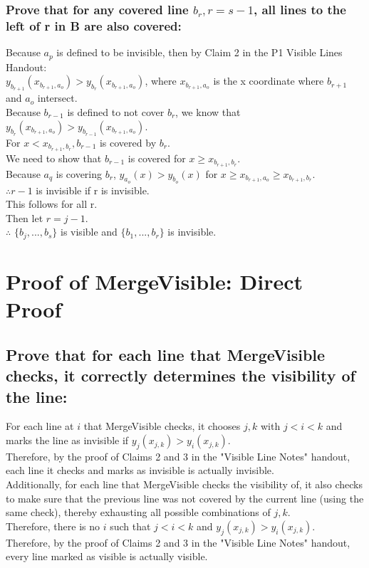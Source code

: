 \documentclass{article}
\begin{document}
    \subsubsection*{Prove that for any covered line  $b_{r}, r = s - 1$, all lines to the left of r in B are also covered:}
        Because $a_p$ is defined to be invisible, then by Claim 2 in the P1 Visible Lines Handout:\\
        $y_{b_{r+1}}(x_{b_{r+1}, a_{o}}) > y_{b_{r}}(x_{b_{r+1},a_{o}})$, where $x_{b_{r+1}, a_{o}}$ is the x coordinate where $b_{r+1}$ and $a_o$ intersect.\\
        Because $b_{r-1}$ is defined to not cover $b_r$, we know that $y_{b_{r}}(x_{b_{r+1}, a_{o}}) > y_{b_{r-1}}(x_{b_{r+1},a_{o}})$.\\
        For $x < x_{b_{r+1},b_{r}}, b_{r-1}$ is covered by $b_r$.\\
        We need to show that $b_{r-1}$ is covered for $x \geq x_{b_{r+1},b_{r}}$.\\
        Because $a_q$ is covering $b_r$, $y_{a_{o}}(x) > y_{b_{o}}(x)$ for $x \geq x_{b_{r+1},a_{o}} \geq x_{b_{r+1},b_{r}}$.\\
        $\therefore r-1$ is invisible if r is invisible.\\
        This follows for all r.\\
        Then let $r = j - 1$.\\
        $\therefore$ $\{b_j,...,b_s\}$ is visible and $\{b_1,...,b_{r}\}$ is invisible.\\

\section*{Proof of MergeVisible: Direct Proof}

\subsection*{Prove that for each line that MergeVisible checks, it correctly determines the visibility of the line:}
For each line at $i$ that MergeVisible checks, it chooses $j, k$ with $j < i < k$ and marks the line as invisible if $y_j (x_{j,k}) > y_i(x_{j,k})$.\\
Therefore, by the proof of Claims 2 and 3 in the "Visible Line Notes" handout, each line it checks and marks as invisible is actually invisible.\\
Additionally, for each line that MergeVisible checks the visibility of, it also checks to make sure that the previous line was not covered by the current line (using the same check), thereby exhausting all possible combinations of $j, k$.\\
Therefore, there is no $i$ such that $j < i < k$ and $y_j (x_{j,k}) > y_i(x_{j,k})$.\\
Therefore, by the proof of Claims 2 and 3 in the "Visible Line Notes" handout, every line marked as visible is actually visible.
\end{document}
